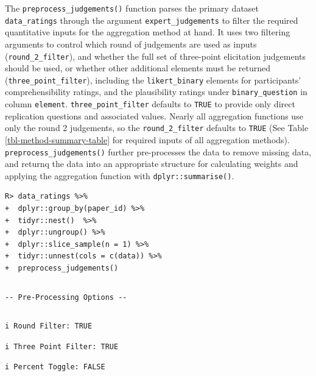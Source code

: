 \documentclass[article]{jss}
\begin{document}
\begin{tcolorbox}[enhanced jigsaw, arc=.35mm, bottomrule=.15mm, breakable, colback=white, colframe=quarto-callout-color-frame, left=2mm, leftrule=.75mm, opacityback=0, rightrule=.15mm, toprule=.15mm]
The \texttt{preprocess\_judgements()} function parses the primary
dataset \texttt{data\_ratings} through the argument
\texttt{expert\_judgements} to filter the required quantitative inputs
for the aggregation method at hand. It uses two filtering arguments to
control which round of judgements are used as inputs
(\texttt{round\_2\_filter}), and whether the full set of three-point
elicitation judgements should be used, or whether other additional
elements must be returned (\texttt{three\_point\_filter}), including the
\texttt{likert\_binary} elements for participants' comprehensibility
ratings, and the plausibility ratings under \texttt{binary\_question} in
column \texttt{element}. \texttt{three\_point\_filter} defaults to
\texttt{TRUE} to provide only direct replication questions and
associated values. Nearly all aggregation functions use only the round 2
judgements, so the \texttt{round\_2\_filter} defaults to \texttt{TRUE}
(See Table \ref{tbl-method-summary-table} for required inputs of all
aggregation methods). \texttt{preprocess\_judgements()} further
pre-processes the data to remove missing data, and returnq the data into
an appropriate structure for calculating weights and applying the
aggregation function with \texttt{dplyr::summarise()}.

\begin{verbatim}
R> data_ratings %>%
+  dplyr::group_by(paper_id) %>%
+  tidyr::nest()  %>%
+  dplyr::ungroup() %>%
+  dplyr::slice_sample(n = 1) %>%
+  tidyr::unnest(cols = c(data)) %>%
+  preprocess_judgements()
\end{verbatim}

\begin{verbatim}
\end{verbatim}

\begin{verbatim}
-- Pre-Processing Options --
\end{verbatim}

\begin{verbatim}
\end{verbatim}

\begin{verbatim}
i Round Filter: TRUE
\end{verbatim}

\begin{verbatim}
i Three Point Filter: TRUE
\end{verbatim}

\begin{verbatim}
i Percent Toggle: FALSE
\end{verbatim}


\end{tcolorbox}
\end{document}
